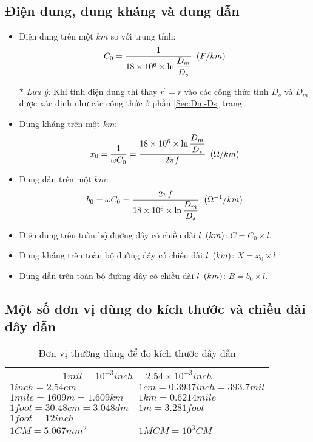 \subsection{Điện dung, dung kháng và dung dẫn}
\begin{itemize}
\item Điện dung trên một $km$ so với trung tính:
	\begin{align*}
		C_0 =\dfrac{1}{18 \times 10^6 \times  \ln{\dfrac{D_m}{D_s}}} ~\left({F/km}\right)
	\end{align*}
\item[$\ast$] \emph{Lưu ý:} Khi tính điện dung thì thay $r^\prime = r$ vào các công thức tính $D_s$ và $D_m$ được xác định như các công thức ở phần \ref{Sec:Dm-Ds} trang \pageref{Sec:Dm-Ds}.
\item Dung kháng trên một $km$:
	\begin{align*}
		x_0 = \dfrac{1}{\omega C_0} = \dfrac{18 \times 10^6 \times \ln{\dfrac{D_m}{D_s}} }{2\pi f} ~\left({\Omega / km}\right)
	\end{align*}
\item Dung dẫn trên một $km$:
	\begin{align*}
		b_0 = \omega C_0 = \dfrac{2\pi f}{18 \times 10^6 \times  \ln{\dfrac{D_m}{D_s}}} ~\left({\Omega^{-1}/km}\right)
	\end{align*}
\item Điện dung trên toàn bộ đường dây có chiều dài  $l ~\left({km}\right)$: $C = C_0 \times l$.
\item Dung kháng trên toàn bộ đường dây có chiều dài  $l ~\left({km}\right)$: $X = x_0 \times l$.
\item Dung dẫn trên toàn bộ đường dây có chiều dài  $l ~\left({km}\right)$: $B = b_0 \times l$.
\end{itemize}
\subsection{Một số đơn vị dùng đo kích thước và chiều dài dây dẫn}
\begin{table}[!h]
\begin{center}
\begin{tabular}{|l|l|}\hline
\multicolumn{2}{|c|}{$1 \unit{mil} = 10^{-3} \unit{inch} = 2.54 \times 10^{-3} \unit{inch}$} \\ \hline
$1 \unit{inch} = 2.54 \unit{cm}$ & $1 \unit{cm} = 0.3937 \unit{inch} = 393.7 \unit{mil}$\\ \hline
$1 \unit{mile} = 1609 \unit{m} = 1.609 \unit{km}$ & $1 \unit{km} = 0.6214 \unit{mile}$ \\ \hline
$1 \unit{foot} = 30.48 \unit{cm} = 3.048 \unit{dm}$ & $1 \unit{m} = 3.281 \unit{foot}$ \\ \hline
$1 \unit{foot} = 12 \unit{inch}$ & \\ \hline
$1 \unit{CM} = 5.067 \unit{mm^2}$ & $1 \unit{MCM} = 10^3 \unit{CM}$\\ \hline
\end{tabular}
\end{center}
\caption{Đơn vị thường dùng để đo kích thước dây dẫn}\label{Tab:don-vi-do-kich-thuoc-day-dan}
\end{table}
